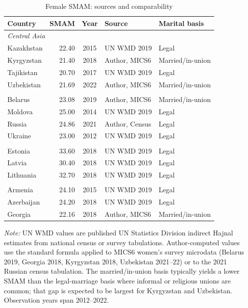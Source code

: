 \begin{table}[htbp]
\centering
\caption{Female SMAM: sources and comparability}
\label{tab:smam}
\small
\begin{tabular}{lrcll}
\toprule
Country & SMAM & Year & Source & Marital basis \\
\midrule
\multicolumn{5}{l}{\textit{Central Asia}} \\
Kazakhstan  & 22.40 & 2015 & UN WMD 2019 & Legal \\
Kyrgyzstan  & 21.40 & 2018 & Author, MICS6 & Married/in-union \\
Tajikistan  & 20.70 & 2017 & UN WMD 2019 & Legal \\
Uzbekistan  & 21.69 & 2022 & Author, MICS6 & Married/in-union \\
\addlinespace
\multicolumn{5}{l}{\textit{Eastern European}} \\
Belarus     & 23.08 & 2019 & Author, MICS6 & Married/in-union \\
Moldova     & 25.00 & 2014 & UN WMD 2019 & Legal \\
Russia      & 24.86 & 2021 & Author, Census & Legal \\
Ukraine     & 23.00 & 2012 & UN WMD 2019 & Legal \\
\addlinespace
\multicolumn{5}{l}{\textit{Baltic}} \\
Estonia     & 33.60 & 2018 & UN WMD 2019 & Legal \\
Latvia      & 30.40 & 2018 & UN WMD 2019 & Legal \\
Lithuania   & 32.70 & 2018 & UN WMD 2019 & Legal \\
\addlinespace
\multicolumn{5}{l}{\textit{Caucasus}} \\
Armenia     & 24.10 & 2015 & UN WMD 2019 & Legal \\
Azerbaijan  & 24.20 & 2018 & UN WMD 2019 & Legal \\
Georgia     & 22.16 & 2018 & Author, MICS6 & Married/in-union \\
\bottomrule
\end{tabular}

\begin{minipage}{\textwidth}\footnotesize
\vspace{4pt}
\emph{Note:} UN WMD values are published UN Statistics Division indirect Hajnal estimates from national census or survey tabulations. Author-computed values use the standard \textcite{hajnal1953} formula applied to MICS6 women's survey microdata (Belarus 2019, Georgia 2018, Kyrgyzstan 2018, Uzbekistan 2021--22) or to the 2021 Russian census tabulation. The married/in-union basis typically yields a lower SMAM than the legal-marriage basis where informal or religious unions are common; that gap is expected to be largest for Kyrgyzstan and Uzbekistan. Observation years span 2012--2022.
\end{minipage}
\end{table}


